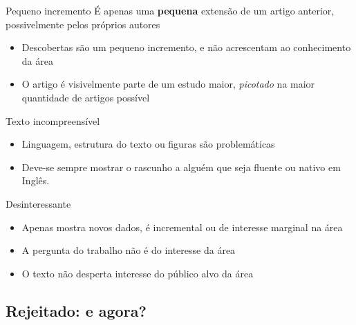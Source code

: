 \documentclass{beamer}
\begin{document}
\begin{frame}{Pequeno incremento}
  É apenas uma {\bf pequena} extensão de um artigo anterior,
  possivelmente pelos próprios autores
  \begin{itemize}
    \footnotesize
  \item Descobertas são um pequeno incremento, e não acrescentam ao
    conhecimento da área
    \bigskip
  \item O artigo é visivelmente parte de um estudo maior, {\em
      picotado} na maior quantidade de artigos possível
  \end{itemize}
\end{frame}

\begin{frame}{Texto incompreensível}
  \begin{itemize}
    \footnotesize
  \item Linguagem, estrutura do texto ou figuras são problemáticas
    \bigskip
  \item Deve-se sempre mostrar o rascunho a alguém que seja fluente ou
    nativo em Inglês.
  \end{itemize}
\end{frame}

\begin{frame}{Desinteressante}
  \begin{itemize}
    \footnotesize
  \item Apenas mostra novos dados, é incremental ou de interesse
    marginal na área
    \bigskip
  \item A pergunta do trabalho não é do interesse da área
    \bigskip
  \item O texto não desperta interesse do público alvo da área
  \end{itemize}
\end{frame}

\subsection{Rejeitado: e agora?}

\end{document}
